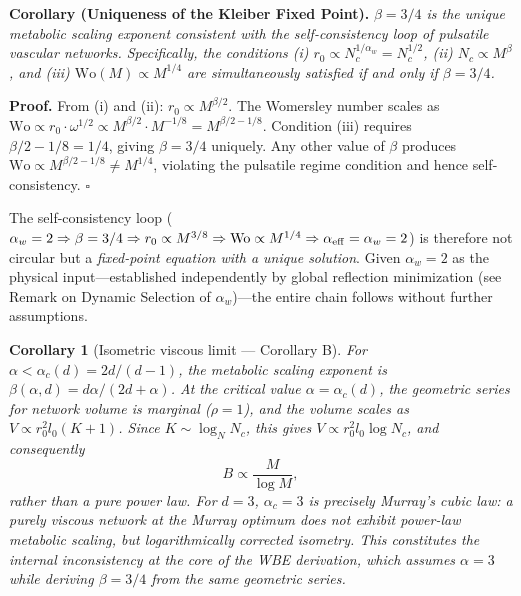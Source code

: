 \documentclass[11pt,a4paper]{article}
\newtheorem{corollary}[theorem]{Corollary}
\theoremstyle{remark}
\begin{document}
\vspace{0.4em}
\noindent\textbf{Corollary (Uniqueness of the Kleiber Fixed Point).}
\textit{$\beta = 3/4$ is the unique metabolic scaling exponent consistent with the self-consistency loop of pulsatile vascular networks. Specifically, the conditions (i) $r_0 \propto N_c^{1/\alpha_w} = N_c^{1/2}$, (ii) $N_c \propto M^\beta$, and (iii) $\mathrm{Wo}(M) \propto M^{1/4}$ are simultaneously satisfied if and only if $\beta = 3/4$.}

\noindent\textbf{Proof.} From (i) and (ii): $r_0 \propto M^{\beta/2}$. The Womersley number scales as $\mathrm{Wo} \propto r_0 \cdot \omega^{1/2} \propto M^{\beta/2} \cdot M^{-1/8} = M^{\beta/2 - 1/8}$. Condition (iii) requires $\beta/2 - 1/8 = 1/4$, giving $\beta = 3/4$ uniquely. Any other value of $\beta$ produces $\mathrm{Wo} \propto M^{\beta/2-1/8} \neq M^{1/4}$, violating the pulsatile regime condition and hence self-consistency. $\square$

\vspace{0.3em}
\noindent The self-consistency loop ($\alpha_w = 2 \Rightarrow \beta = 3/4 \Rightarrow r_0 \propto M^{3/8} \Rightarrow \mathrm{Wo} \propto M^{1/4} \Rightarrow \alpha_{\rm eff} = \alpha_w = 2$) is therefore not circular but a \emph{fixed-point equation with a unique solution}. Given $\alpha_w = 2$ as the physical input---established independently by global reflection minimization (see Remark on Dynamic Selection of $\alpha_w$)---the entire chain follows without further assumptions.

\vspace{0.5em}
\begin{corollary}[Isometric viscous limit --- Corollary B]
For $\alpha < \alpha_c(d) = 2d/(d-1)$, the metabolic scaling exponent is
$\beta(\alpha, d) = d\alpha/(2d+\alpha)$. At the critical value $\alpha = \alpha_c(d)$,
the geometric series for network volume is marginal ($\rho = 1$), and the volume
scales as $V \propto r_0^2 l_0 (K+1)$. Since $K \sim \log_{N} N_c$, this gives
$V \propto r_0^2 l_0 \log N_c$, and consequently
\begin{equation}
B \propto \frac{M}{\log M},
\end{equation}
rather than a pure power law. For $d = 3$, $\alpha_c = 3$ is precisely Murray's
cubic law: a purely viscous network at the Murray optimum does not exhibit
power-law metabolic scaling, but logarithmically corrected isometry.
This constitutes the internal inconsistency at the core of the WBE derivation,
which assumes $\alpha = 3$ while deriving $\beta = 3/4$ from the same geometric
series.
\end{corollary}
\end{document}
